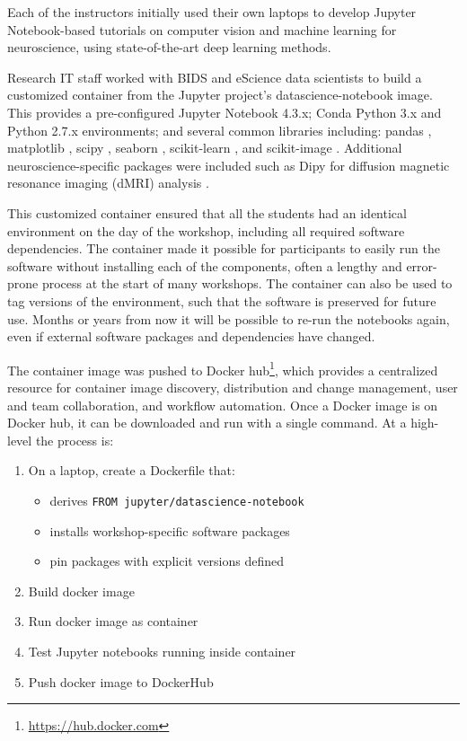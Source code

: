 Each of the instructors initially used their own laptops to develop Jupyter
Notebook-based tutorials on computer vision and machine learning for
neuroscience, using state-of-the-art deep learning methods.

Research IT staff worked with BIDS and eScience data scientists to build a
customized container from the Jupyter project's datascience-notebook image. This
provides a pre-configured Jupyter Notebook 4.3.x; Conda Python 3.x and Python
2.7.x environments; and several common libraries including: pandas
\cite{mckinney-proc-scipy-2010}, matplotlib \cite{hunter2007matplotlib}, scipy
\cite{scipy}, seaborn \cite{michael_waskom_2014_12710}, scikit-learn
\cite{Pedregosa2012-dm}, and scikit-image \cite{van2014scikit}. Additional
neuroscience-specific packages were included such as Dipy for diffusion magnetic
resonance imaging (dMRI) analysis \cite{Garyfallidis2014FrontNeuroinf}.

This customized container ensured that all the students had an identical
environment on the day of the workshop, including all required software
dependencies. The container made it possible for participants to easily run the
software without installing each of the components, often a lengthy and
error-prone process at the start of many workshops. The container can also be
used to tag versions of the environment, such that the software is preserved
for future use. Months or years from now it will be possible to re-run the
notebooks again, even if external software packages and dependencies have
changed.

The container image was pushed to Docker hub\footnote{\url{https://hub.docker.com}},
which provides a centralized resource for container image discovery,
distribution and change management, user and team collaboration, and workflow
automation. Once a Docker image is on Docker hub, it can be downloaded and run
with a single command. At a high-level the process is:

\begin{enumerate}
  \item On a laptop, create a Dockerfile that:
  \begin{itemize}
    \item derives \texttt{FROM jupyter/datascience-notebook}
    \item installs workshop-specific software packages
    \item pin packages with explicit versions defined
  \end{itemize}
  \item Build docker image
  \item Run docker image as container
  \item Test Jupyter notebooks running inside container
  \item Push docker image to DockerHub
\end{enumerate}


